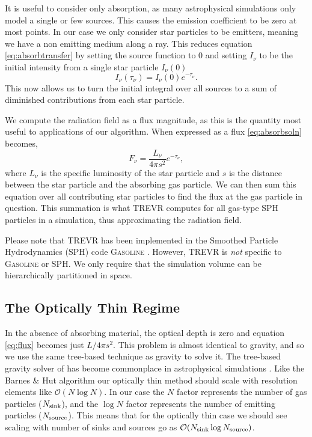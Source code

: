 \documentclass[fleqn,usenatbib]{mnras}
\newcommand{\acro}{TREVR}
\begin{document}
It is useful to consider only absorption, as many astrophysical simulations 
only model a single or few sources. This causes the emission coefficient to be 
zero at most points. In our case we only consider star particles to be emitters,
 meaning we have a non emitting medium along a ray. This reduces equation 
\ref{eq:absorbtransfer} by setting the source function to 0 and setting 
$I_\nu$ to be the initial intensity from a single star particle $I_\nu(0)$ 
\begin{equation}
\label{eq:absorbsoln}
I_\nu(\tau_\nu) = I_\nu(0)e^{-\tau_\nu}.
\end{equation}
This now allows us to turn the initial integral over all sources to a sum of
diminished contributions from each star particle.

We compute the radiation field as a flux magnitude, as this is the quantity most
 useful to applications of our algorithm. When expressed as a flux 
\ref{eq:absorbsoln} becomes,
\begin{equation}
\label{eq:flux}
F_\nu = \frac{L_\nu}{4\pi s^2} e^{-\tau_\nu},
\end{equation}
where $L_\nu$ is the specific luminosity of the star particle and $s$ is the 
distance between the star particle and the absorbing gas particle. We can then 
sum this equation over all contributing star particles to find the flux at 
the gas particle in question. This summation is what \acro{} computes for all 
gas-type SPH particles in a simulation, thus approximating the radiation field.

Please note that \acro{} has been implemented in the Smoothed Particle 
Hydrodynamics (SPH) code \textsc{Gasoline} \citep{wadsleyEt03}. However, 
\acro{} is \emph{not} specific to \textsc{Gasoline} or SPH. We only require 
that the simulation volume can be hierarchically partitioned in space.

\subsection{The Optically Thin Regime}
In the absence of absorbing material, the optical depth is zero and equation 
\ref{eq:flux} becomes just $L/4\pi s^2$. This problem is almost identical to 
gravity, and so we use the same tree-based technique as gravity to solve it. 
The tree-based gravity solver of \citet{barnesHut86} has become commonplace in 
astrophysical simulations 
\citep{hubberEt11,wadsleyEt03,springelEt01,vineSigurdsson98,benz88}. Like the 
Barnes \& Hut algorithm our optically thin method should scale with resolution
 elements like $\mathcal{O}(N\log{N})$. In our case the $N$ factor represents 
the number of gas particles ($N_{\rm sink}$), and the $\log{N}$ factor 
represents the number of emitting particles ($N_{\rm source}$). This means that
for the optically thin case we should see scaling with number of sinks and 
sources go as $\mathcal{O}(N_{\rm sink} \log{N_{\rm source}})$. 
\end{document}
